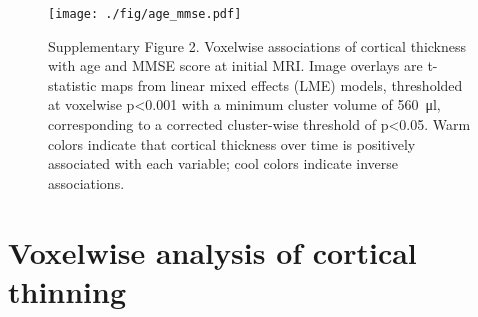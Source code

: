 \documentclass[]{article}
\begin{document}
\begin{figure}[]

{\centering \texttt{[image: ./fig/age\_mmse.pdf]} 

}

\caption[Age and global cognition associations]{Supplementary Figure 2. Voxelwise associations of cortical thickness with age and MMSE score at initial MRI. Image overlays are t-statistic maps from linear mixed effects (LME) models, thresholded at voxelwise p<0.001 with a minimum cluster volume of \SI{560}{\micro\litre}, corresponding to a corrected cluster-wise threshold of p<0.05. Warm colors indicate that cortical thickness over time is positively associated with each variable; cool colors indicate inverse associations. \label{age_mmse}}

\end{figure}

\section*{Voxelwise analysis of cortical
thinning}\label{voxelwise-analysis-of-cortical-thinning}
\end{document}
